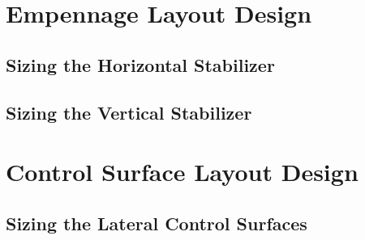 \documentclass[conf]{new-aiaa}
\begin{document}
\section{Empennage Layout Design}
\subsection{Sizing the Horizontal Stabilizer} %
\subsection{Sizing the Vertical Stabilizer}

\section{Control Surface Layout Design}
\subsection{Sizing the Lateral Control Surfaces}
\end{document}
